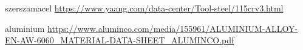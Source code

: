 \begin{thebibliography}{9}

\begin{bibitem}{szerszamacel}
\url{https://www.yaang.com/data-center/Tool-steel/115crv3.html}
\end{bibitem}

\begin{bibitem}{aluminium}
\url{https://www.aluminco.com/media/155961/ALUMINIUM-ALLOY-EN-AW-6060_MATERIAL-DATA-SHEET_ALUMINCO.pdf}
\end{bibitem}

\end{thebibliography}
